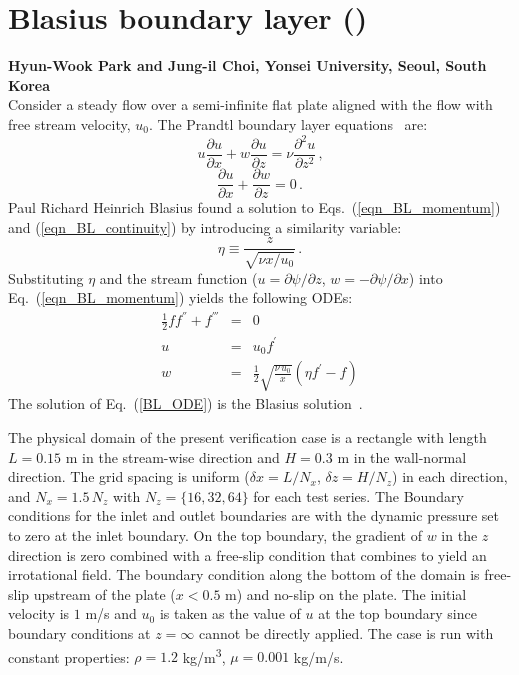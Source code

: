 \documentclass[11pt]{book}
\begin{document}
\section{Blasius boundary layer (\texorpdfstring{}{blasius})}
\label{sec:blasius}

\textbf{Hyun-Wook Park and Jung-il Choi, Yonsei University, Seoul, South Korea}\\

\noindent Consider a steady flow over a semi-infinite flat plate aligned with the flow with free stream velocity, $u_0$. The Prandtl boundary layer equations~\cite{Panton:1} are:
\begin{equation}
\label{eqn_BL_momentum}
u \frac{\partial u}{\partial x} + w \frac{\partial u}{\partial z} = \nu \frac{\partial^2 u}{\partial z^2} \,\mbox{,}
\end{equation}
\begin{equation}
\label{eqn_BL_continuity}
\frac{\partial u}{\partial x}+\frac{\partial w}{\partial z} = 0 \,\mbox{.}
\end{equation}
Paul Richard Heinrich Blasius found a solution to Eqs.~(\ref{eqn_BL_momentum}) and (\ref{eqn_BL_continuity}) by introducing a similarity variable:
\begin{equation}
\label{eta}
\eta\equiv\frac{z}{\sqrt{\nu x/u_0}} \,\mbox{.}
\end{equation}
Substituting $\eta$ and the stream function ($u = \partial \psi/\partial z$, $w = -\partial \psi/\partial x$) into Eq.~(\ref{eqn_BL_momentum}) yields the following ODEs:
\begin{eqnarray}
\label{BL_ODE}
\frac{1}{2}f f^{''}+f^{'''}&=&0 \\
u&=&u_0 f^{'} \\
w&=&\frac{1}{2}\sqrt{\frac{\nu \,u_0}{x}}(\eta f^{'}-f)
\end{eqnarray}
The solution of Eq.~(\ref{BL_ODE}) is the Blasius solution~\cite{Panton:1}.

The physical domain of the present verification case is a rectangle with length $L=0.15$ m in the stream-wise direction and $H=0.3$ m in the wall-normal direction. The grid spacing is uniform ($\delta x = L/N_x$, $\delta z =H/N_z$) in each direction, and $N_x = 1.5 \, N_z$ with $N_z = \{16, 32, 64\}$ for each test series. The Boundary conditions for the inlet and outlet boundaries are  with the dynamic pressure set to zero at the inlet boundary. On the top boundary, the gradient of $w$ in the $z$ direction is zero combined with a free-slip condition that combines to yield an irrotational field. The boundary condition along the bottom of the domain is free-slip upstream of the plate ($x<0.5$ m) and no-slip on the plate. The initial velocity is $1$ m/s and $u_0$ is taken as the value of $u$ at the top boundary since boundary conditions at $z=\infty$ cannot be directly applied. The case is run with constant properties: $\rho=1.2$ \si{kg/m^3}, $\mu = 0.001$ kg/m/s.
\end{document}
